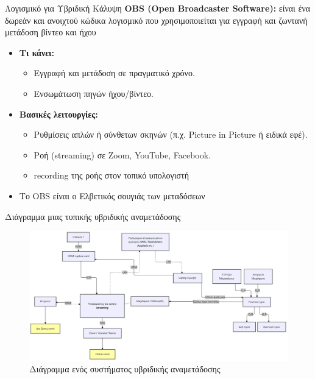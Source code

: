 \documentclass{beamer}
\begin{document}
\begin{frame}{Λογισμικό για Υβριδική Κάλυψη}
  \textbf{OBS (Open Broadcaster Software):}
  είναι ένα δωρεάν και ανοιχτού κώδικα λογισμικό που χρησιμοποιείται για
  εγγραφή και ζωντανή μετάδοση βίντεο και ήχου
  \begin{itemize}
  \item \textbf{Τι κάνει:}
    \begin{itemize}
    \item Εγγραφή και μετάδοση σε πραγματικό χρόνο.
    \item Ενσωμάτωση πηγών ήχου/βίντεο.
    \end{itemize}
  \item \textbf{Βασικές λειτουργίες:}
    \begin{itemize}
    \item Ρυθμίσεις απλών ή σύνθετων σκηνών (π.χ. Picture in Picture ή ειδικά εφέ).
    \item Ροή (streaming) σε Zoom, YouTube, Facebook.
    \item recording της ροής στον τοπικό υπολογιστή
    \end{itemize}
  \item Το OBS είναι ο Ελβετικός σουγιάς των μεταδόσεων
  \end{itemize}
\end{frame}
  \begin{frame}{Διάγραμμα μιας τυπικής υβριδικής αναμετάδοσης}
    \begin{figure}
      \centering
      \includegraphics[width=1\textwidth]{images/diagram.png}
      \caption{Διάγραμμα ενός συστήματος υβριδικής αναμετάδοσης}
    \end{figure}
  \end{frame}
\end{document}
